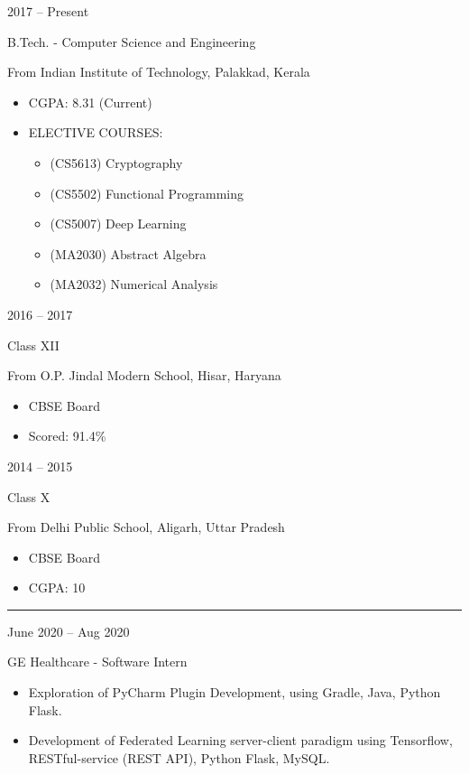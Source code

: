 \documentclass[a4paper,10pt]{article}
\newlength{\cvcolumngapwidth}
\newlength{\cvleftcolumnwidth}
\newlength{\cvrightcolumnwidth}
\newcommand{\cvsectionstyle}[1]{{\normalsize\cvsectionfont\textcolor{cvsectioncolor}{#1}}}
\newcommand{\cvtitlestyle}[1]{{\large\cvtitlefont\textcolor{cvtitlecolor}{#1}}}
\newcommand{\cvdurationstyle}[1]{{\small\cvdurationfont\textcolor{cvdurationcolor}{#1}}}
\newlength{\cvafteritemskipamount}
\newlength{\cvaftersectionskipamount}
\newlength{\cvbetweensectionandheadingextraskipamount}
\newlength{\cvaftertitleskipamount}
\newlength{\cvparskip}
\newcommand{\cvsection}[1]{
    \begin{minipage}[t]{\cvleftcolumnwidth}
        \raggedleft\cvsectionstyle{#1}
    \end{minipage}%
    \hspace{\cvcolumngapwidth}%
    \begin{minipage}[t]{\cvrightcolumnwidth}
        \textcolor{cvrulecolor}{\rule{\cvrightcolumnwidth}{0.3mm}}
    \end{minipage}

    \vspace{\cvaftersectionskipamount}
}
\newcommand{\cvitem}[2]{
    \begin{minipage}[t]{\cvleftcolumnwidth}
        \raggedleft #1
    \end{minipage}%
    \hspace{\cvcolumngapwidth}%
    \begin{minipage}[t]{\cvrightcolumnwidth}
        \setlength{\parskip}{\cvparskip} #2
    \end{minipage}

    \vspace{\cvafteritemskipamount}
}
\newcommand{\cvtitle}[1]{
    \cvtitlestyle{#1}

    \vspace{\cvaftertitleskipamount}
    \vspace{-\cvparskip}
}
\begin{document}
\cvitem{
    \cvdurationstyle{2017 -- Present}
}{
    \cvtitle{B.Tech. - Computer Science and Engineering}

    From Indian Institute of Technology, Palakkad, Kerala

    \begin{itemize}[leftmargin=*]
        \item CGPA: 8.31 (Current)
        \item ELECTIVE COURSES: 
        \begin{itemize}[leftmargin=*]
        \item (CS5613) Cryptography
        \item (CS5502) Functional Programming
        \item (CS5007) Deep Learning
        \item (MA2030) Abstract Algebra
        \item (MA2032) Numerical Analysis
        \end{itemize}
    \end{itemize}
}

\cvitem{
    \cvdurationstyle{2016 -- 2017}
}{
    \cvtitle{Class XII}

    From O.P. Jindal Modern School, Hisar, Haryana

    \begin{itemize}[leftmargin=*]
        \item CBSE Board
        \item Scored: 91.4\%
    \end{itemize}
}

\cvitem{
    \cvdurationstyle{2014 -- 2015}
}{
    \cvtitle{Class X}

    From Delhi Public School, Aligarh, Uttar Pradesh

    \begin{itemize}[leftmargin=*]
        \item CBSE Board
        \item CGPA: 10
    \end{itemize}
}


\cvsection{EXPERIENCE}

\vspace{\cvbetweensectionandheadingextraskipamount}

\cvitem{
    \cvdurationstyle{June 2020 -- Aug 2020}
}{
    \cvtitle{GE Healthcare - Software Intern}

    \begin{itemize}[leftmargin=*]
        \item Exploration of PyCharm Plugin Development, using Gradle, Java, Python Flask.
        \item Development of Federated Learning server-client paradigm using Tensorflow, RESTful-service (REST API), Python Flask, MySQL.
    \end{itemize}
}
\end{document}
